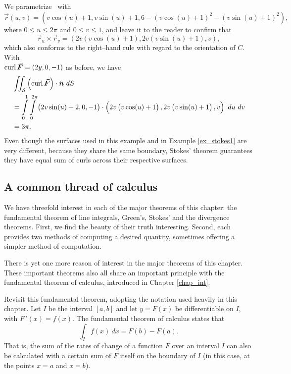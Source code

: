 \begin{example}
We parametrize \surfaceS\ with $$\vec r(u,v) = \left( v\cos (u)+1,v\sin (u)+1, 6-(v\cos (u)+1)^2-(v\sin (u)+1)^2\right),$$
where $0\leq u\leq 2\pi$ and $0\leq v\leq 1$, and leave it to the reader to confirm that
$$\vec r_u\times \vec r_v = \left( 2v\left(v\cos (u)+1\right), 2v\left(v\sin (u)+1\right),v\right),$$
which also conforms to the right--hand rule with regard to the orientation of $C$. With \\ $\curl \vec F = \left( 2y,0,-1\right)$ as before, we have
\begin{align*}
&\iint_\surfaceS \left(\curl\vec F\right)\cdot \hat n\ dS \\ 
&=\int\limits_0^1\int\limits_0^{2\pi} \left( 2v\sin (u)+2,0,-1\right)\cdot \left( 2v\left(v\cos (u)+1\right), 2v\left(v\sin (u)+1\right),v\right)\ du\ dv \\
&=3\pi.
\end{align*}
Even though the  surfaces used in this example and in Example \ref{ex_stokes1} are very different, because they share the same boundary, Stokes' theorem guarantees they have equal sum of curls across their respective surfaces.
\end{example}


\subsection{A common thread of calculus}

We have threefold interest in each of the major theorems of this chapter: the fundamental theorem of line integrals, Green's, Stokes' and the divergence theorems. First, we find the beauty of their truth interesting. Second, each provides two methods of computing a desired quantity, sometimes offering a simpler method of computation. 


There is yet one more reason of interest in the major theorems of this chapter. %
These important theorems also all share an important principle with the fundamental theorem of calculus, introduced in Chapter \ref{chap_int}. 

Revisit this fundamental theorem, adopting the notation used heavily in this chapter. Let $I$ be the interval $[a,b]$ and let $y=F(x)$ be differentiable on $I$, with $F\,'(x) = f(x)$. The fundamental theorem of calculus states that 
$$\int_I f(x)\ dx = F(b) - F(a).$$
That is, the sum of the rates of change of a function $F$ over an interval $I$ can also be calculated with a certain sum of $F$ itself on the boundary of $I$ (in this case, at the points $x=a$ and $x=b$).


